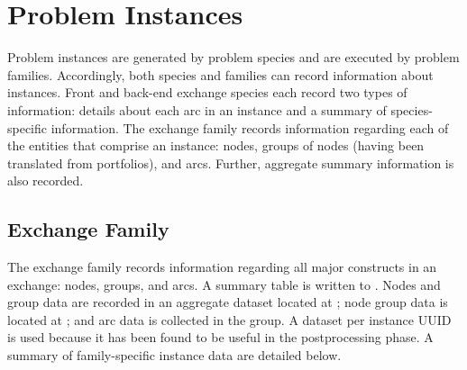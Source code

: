 \section{Problem Instances}

Problem instances are generated by problem species and are executed by problem
families. Accordingly, both species and families can record information about
instances. Front and back-end exchange species each record two types of
information: details about each arc in an instance and a summary of
species-specific information. The exchange family records information regarding
each of the entities that comprise an instance: nodes, groups of nodes (having
been translated from portfolios), and arcs. Further, aggregate summary
information is also recorded. 

\subsection{Exchange Family}

The exchange family records information regarding all major constructs in an
exchange: nodes, groups, and arcs. A summary table is written to
. Nodes and group data are
recorded in an aggregate dataset located at
; node group data is located at
; and arc data is collected in the
 group. A dataset per instance UUID
is used because it has been found to be useful in the postprocessing phase. A
summary of family-specific instance data are detailed below.

